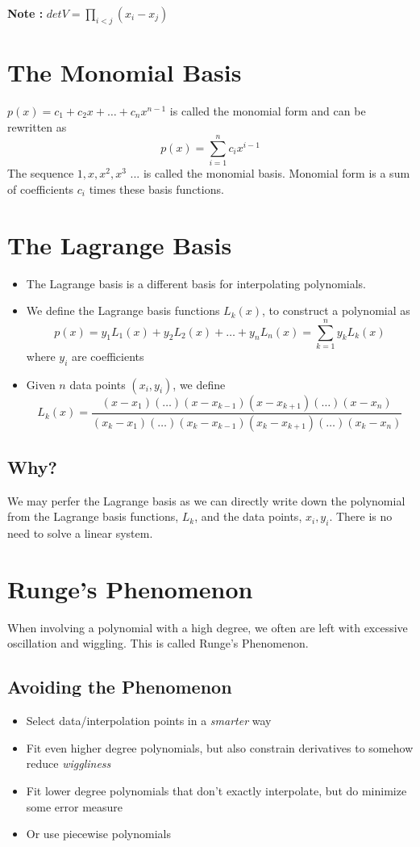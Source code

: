 \documentclass[twoside]{article}
\begin{document}
\textbf{Note : } $ det V = \prod_{i < j} (x_i - x_j)  $

\section{The Monomial Basis}
$p(x) = c_1 + c_2x + \ldots + c_n x^{n-1}$ is called the monomial form and can be rewritten as 
$$ p(x) = \sum_{i=1}^{n} c_i x^{i-1} $$
The sequence \(1, x, x^2, x^3\) ... is called the monomial basis. Monomial form is a sum of coefficients \(c_i\) times these basis functions.

\section{The Lagrange Basis}
\begin{itemize}
\item The Lagrange basis is a different basis for interpolating polynomials.
\item We define the Lagrange basis functions \(L_k(x)\), to construct a polynomial as 
$$p(x) = y_1 L_1 (x) + y_2L_2(x) + \ldots + y_n L_n(x) = \sum_{k=1}^{n} y_k L_k(x) $$
where \(y_i\) are coefficients 
\item Given \(n\) data points \((x_i, y_i)\), we define 
$$ L_k(x) = \frac{(x - x_1)(\ldots)(x - x_{k-1}) (x - x_{k+1})(\ldots) (x - x_n)   }{  (x_k - x_1) (\ldots) (x_k - x_{k-1}) (x_k - x_{k+1}) (\ldots) (x_k - x_n) } $$
\end{itemize}

\subsection{Why?}
We may perfer the Lagrange basis as we can directly write down the polynomial from the Lagrange basis functions, \(L_k\), and the data points, \(x_i, y_i\). There is no need to solve a linear system. 


\section{Runge's Phenomenon}

When involving a polynomial with a high degree, we often are left with excessive oscillation and wiggling. This is called Runge's Phenomenon.

\subsection{Avoiding the Phenomenon}
\begin{itemize}
\item Select data/interpolation points in a \textit{smarter} way
\item Fit even higher degree polynomials, but also constrain derivatives to somehow reduce \textit{wiggliness}
\item Fit lower degree polynomials that don't exactly interpolate, but do minimize some error measure
\item Or use piecewise polynomials
\end{itemize}
\end{document}
